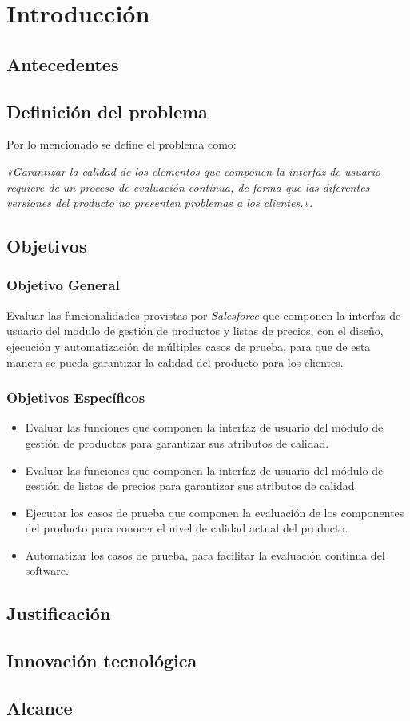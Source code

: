 \chapter{Introducción}

\section{Antecedentes}

\section{Definición del problema}
Por lo mencionado se define el problema como:

\emph{«Garantizar la calidad de los elementos que componen la interfaz de
usuario requiere de un proceso de evaluación continua, de forma que las
diferentes versiones del producto no presenten problemas a los clientes.»}.

\section{Objetivos}

\subsection{Objetivo General}
Evaluar las funcionalidades provistas por \emph{Salesforce} que componen la
interfaz de usuario del modulo de gestión de productos y listas de precios, con
el diseño, ejecución y automatización de múltiples casos de prueba, para que de
esta manera se pueda garantizar la calidad del producto para los clientes.

\subsection{Objetivos Específicos}
\begin{itemize}
\item Evaluar las funciones que componen la interfaz de usuario del módulo de
    gestión de productos para garantizar sus atributos de calidad.
\item Evaluar las funciones que componen la interfaz de usuario del módulo de
    gestión de listas de precios para garantizar sus atributos de calidad.
\item Ejecutar los casos de prueba que componen la evaluación de los
    componentes del producto para conocer el nivel de calidad actual del
    producto.
\item Automatizar los casos de prueba, para facilitar la evaluación continua del
    software.
\end{itemize}

\section{Justificación}

\section{Innovación tecnológica}

\section{Alcance}

